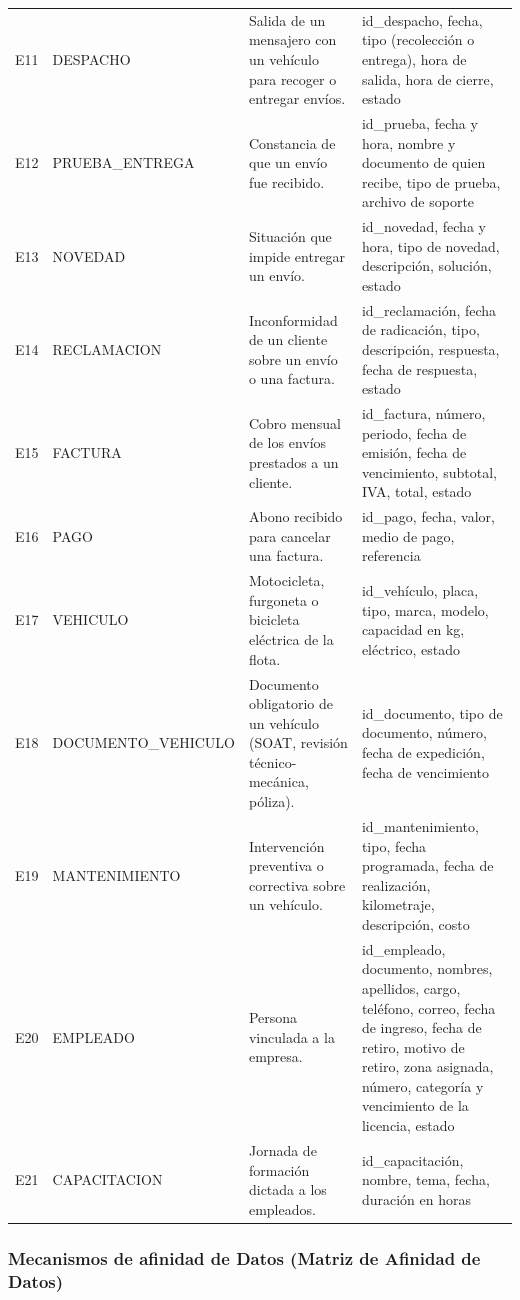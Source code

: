 {\begin{longtable}{L{0.9cm} L{3.4cm} L{4.2cm} L{5.6cm}}
E11 & DESPACHO & Salida de un mensajero con un vehículo para recoger o entregar envíos. & id\_despacho, fecha, tipo (recolección o entrega), hora de salida, hora de cierre, estado \\
E12 & PRUEBA\_\allowbreak ENTREGA & Constancia de que un envío fue recibido. & id\_prueba, fecha y hora, nombre y documento de quien recibe, tipo de prueba, archivo de soporte \\
E13 & NOVEDAD & Situación que impide entregar un envío. & id\_novedad, fecha y hora, tipo de novedad, descripción, solución, estado \\
E14 & RECLAMACION & Inconformidad de un cliente sobre un envío o una factura. & id\_reclamación, fecha de radicación, tipo, descripción, respuesta, fecha de respuesta, estado \\
E15 & FACTURA & Cobro mensual de los envíos prestados a un cliente. & id\_factura, número, periodo, fecha de emisión, fecha de vencimiento, subtotal, IVA, total, estado \\
E16 & PAGO & Abono recibido para cancelar una factura. & id\_pago, fecha, valor, medio de pago, referencia \\
E17 & VEHICULO & Motocicleta, furgoneta o bicicleta eléctrica de la flota. & id\_vehículo, placa, tipo, marca, modelo, capacidad en kg, eléctrico, estado \\
E18 & DOCUMENTO\_\allowbreak VEHICULO & Documento obligatorio de un vehículo (SOAT, revisión técnico-mecánica, póliza). & id\_documento, tipo de documento, número, fecha de expedición, fecha de vencimiento \\
E19 & MANTENIMIENTO & Intervención preventiva o correctiva sobre un vehículo. & id\_mantenimiento, tipo, fecha programada, fecha de realización, kilometraje, descripción, costo \\
E20 & EMPLEADO & Persona vinculada a la empresa. & id\_empleado, documento, nombres, apellidos, cargo, teléfono, correo, fecha de ingreso, fecha de retiro, motivo de retiro, zona asignada, número, categoría y vencimiento de la licencia, estado \\
E21 & CAPACITACION & Jornada de formación dictada a los empleados. & id\_capacitación, nombre, tema, fecha, duración en horas \\
\end{longtable}
\par}

\subsubsection{Mecanismos de afinidad de Datos (Matriz de Afinidad de Datos)}

